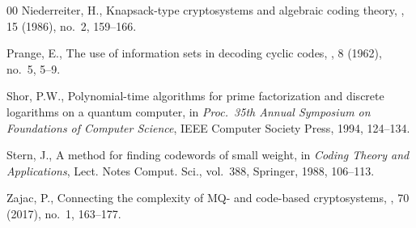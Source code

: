 \documentclass{amsart}
\begin{document}
\begin{thebibliography}{00}
Niederreiter, H.,
\newblock Knapsack-type cryptosystems and algebraic coding theory,
, 15 (1986), no.~2, 159--166.

Prange, E.,
\newblock The use of information sets in decoding cyclic codes,
, 8 (1962), no.~5, 5--9.

Shor, P.W.,
\newblock Polynomial-time algorithms for prime factorization and discrete
logarithms on a quantum computer,
\newblock in {\em Proc.\ 35th Annual Symposium on Foundations of Computer
Science}, IEEE Computer Society Press, 1994, 124--134.

Stern, J.,
\newblock A method for finding codewords of small weight,
\newblock in {\em Coding Theory and Applications}, Lect. Notes Comput. Sci.,
vol.~388, Springer, 1988, 106--113.

Zajac, P.,
\newblock Connecting the complexity of MQ- and code-based cryptosystems,
, 70 (2017), no.~1, 163--177.

\end{thebibliography}
\end{document}
